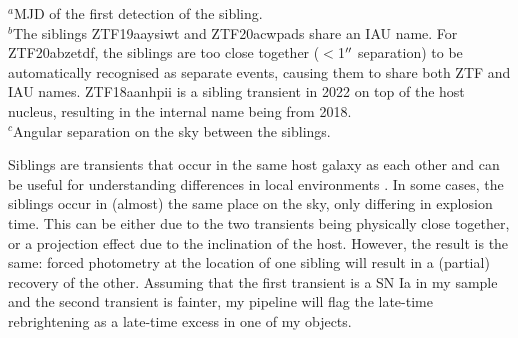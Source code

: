 \documentclass[a4paper,oneside,12pt, class=Latex/Classes/PhDthesisPSnPDF, crop=false]{standalone}
\begin{document}
\begin{table}
 \centering
 \caption{Objects with a detected sibling transient.}
 \begin{flushleft}
$^a$MJD of the first detection of the sibling. \\
$^b$The siblings ZTF19aaysiwt and ZTF20acwpads share an IAU name. For ZTF20abzetdf, the siblings are too close together ($<$1$^{\prime\prime}$ separation) to be automatically recognised as separate events, causing them to share both ZTF and IAU names. ZTF18aanhpii is a sibling transient in 2022 on top of the host nucleus, resulting in the internal name being from 2018. \\
$^c$Angular separation on the sky between the siblings. \\
\end{flushleft} 
 \label{siblings}
\end{table}


Siblings are transients that occur in the same host galaxy as each other and can be useful for understanding differences in local environments \citep[e.g.][]{biswas_siblings, ZTF_siblings}. In some cases, the siblings occur in (almost) the same place on the sky, only differing in explosion time. This can be either due to the two transients being physically close together, or a projection effect due to the inclination of the host. However, the result is the same: forced photometry at the location of one sibling will result in a (partial) recovery of the other. Assuming that the first transient is a SN Ia in my sample and the second transient is fainter, my pipeline will flag the late-time rebrightening as a late-time excess in one of my objects.
\end{document}

